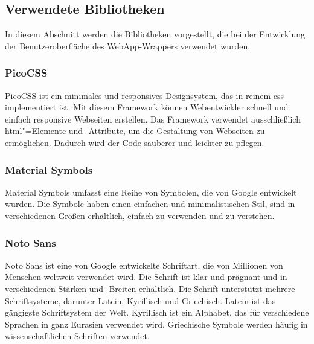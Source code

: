 \subsection{Verwendete Bibliotheken}

In diesem Abschnitt werden die Bibliotheken vorgestellt, die bei der Entwicklung der Benutzeroberfläche des WebApp-Wrappers verwendet wurden.

\subsubsection{PicoCSS}

PicoCSS ist ein minimales und responsives Designsystem, das in reinem \ac{css} implementiert ist.
Mit diesem Framework können Webentwickler schnell und einfach responsive Webseiten erstellen.
Das Framework verwendet ausschließlich \acs{html}"=Elemente und -Attribute, um die Gestaltung von Webseiten zu ermöglichen.
Dadurch wird der Code sauberer und leichter zu pflegen.
\cite{pico}

\subsubsection{Material Symbols}

Material Symbols umfasst eine Reihe von Symbolen, die von Google entwickelt wurden.
Die Symbole haben einen einfachen und minimalistischen Stil, sind in verschiedenen Größen erhältlich, einfach zu verwenden und zu verstehen.
\cite{symbols}

\subsubsection{Noto Sans}

Noto Sans ist eine von Google entwickelte Schriftart, die von Millionen von Menschen weltweit verwendet wird.
Die Schrift ist klar und prägnant und in verschiedenen Stärken und -Breiten erhältlich.
Die Schrift unterstützt mehrere Schriftsysteme, darunter Latein, Kyrillisch und Griechisch.
Latein ist das gängigste Schriftsystem der Welt.
Kyrillisch ist ein Alphabet, das für verschiedene Sprachen in ganz Eurasien verwendet wird.
Griechische Symbole werden häufig in wissenschaftlichen Schriften verwendet.
\cite{noto}
